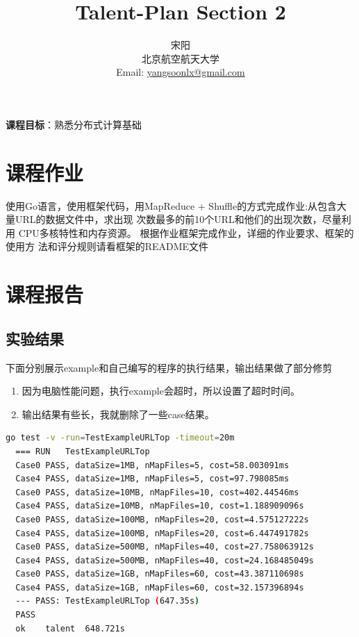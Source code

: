 \documentclass[UTF8]{ctexart}
\title{\huge{\heiti Talent-Plan Section 2}}
\author{\small{\kaishu 宋阳}\\[2pt]
\small{\kaishu 北京航空航天大学}\\[2pt]
\small{Email:}
\url{yangsoonlx@gmail.com}
}
\date{} %
\begin{document}
\maketitle

\begin{flushleft}
\textbf{课程目标}：熟悉分布式计算基础 \\[8pt]
\end{flushleft}
\section{课程作业}\label{sec1}

使用Go语言，使用框架代码，用MapReduce + Shuffle的方式完成作业:从包含大量URL的数据文件中，求出现
次数最多的前10个URL和他们的出现次数，尽量利用
CPU多核特性和内存资源。
根据作业框架完成作业，详细的作业要求、框架的使用方
法和评分规则请看框架的README文件 \\

\section{课程报告}\label{sec2}

\subsection{实验结果}

下面分别展示example和自己编写的程序的执行结果，输出结果做了部分修剪

\begin{enumerate}
  \item 因为电脑性能问题，执行example会超时，所以设置了超时时间。
  \item 输出结果有些长，我就删除了一些case结果。
\end{enumerate}
\begin{lstlisting}[language={bash}]
  go test -v -run=TestExampleURLTop -timeout=20m
  === RUN   TestExampleURLTop
  Case0 PASS, dataSize=1MB, nMapFiles=5, cost=58.003091ms
  Case4 PASS, dataSize=1MB, nMapFiles=5, cost=97.798085ms
  Case0 PASS, dataSize=10MB, nMapFiles=10, cost=402.44546ms
  Case4 PASS, dataSize=10MB, nMapFiles=10, cost=1.188909096s
  Case0 PASS, dataSize=100MB, nMapFiles=20, cost=4.575127222s
  Case4 PASS, dataSize=100MB, nMapFiles=20, cost=6.447491782s
  Case0 PASS, dataSize=500MB, nMapFiles=40, cost=27.758063912s
  Case4 PASS, dataSize=500MB, nMapFiles=40, cost=24.168485049s
  Case0 PASS, dataSize=1GB, nMapFiles=60, cost=43.387110698s
  Case4 PASS, dataSize=1GB, nMapFiles=60, cost=32.157396894s
  --- PASS: TestExampleURLTop (647.35s)
  PASS
  ok  	talent	648.721s
\end{lstlisting}
\end{document}
